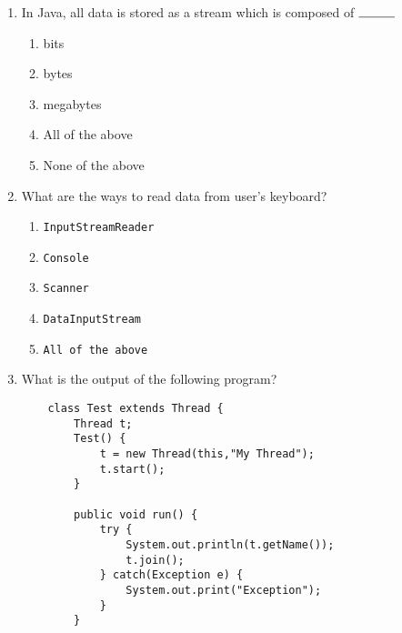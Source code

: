 \documentclass[S17-Final.tex]{subfiles}
\begin{document}
\begin{enumerate}
\item In Java, all data is stored as a stream which is composed of $\rule{1cm}{0.15mm}$
	
\begin{enumerate}
\item  bits
\item  bytes \ifdraft \Ans \fi 
\item  megabytes
\item  All of the above
\item  None of the above
\end{enumerate}
\clearpage
\item What are the ways to read data from user's keyboard?
	
\begin{enumerate}
\item  \texttt{InputStreamReader}
\item  \texttt{Console}
\item  \texttt{Scanner}
\item  \texttt{DataInputStream}
\item  \texttt{All of the above} \ifdraft \Ans \fi 
\end{enumerate}

	

\item What is the output of the following program?
\begin{lstlisting}
    class Test extends Thread {
        Thread t;
        Test() {
            t = new Thread(this,"My Thread");
            t.start();
        }
        
        public void run() {
            try {
                System.out.println(t.getName());
                t.join();
            } catch(Exception e) {
                System.out.print("Exception");
            }
        }
        

\end{lstlisting}
\end{enumerate}
\end{document}
